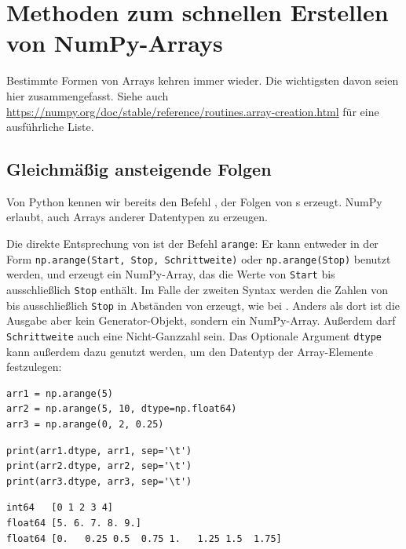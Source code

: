 \section{Methoden zum schnellen Erstellen von NumPy-Arrays}
Bestimmte Formen von Arrays kehren immer wieder. Die wichtigsten davon seien hier zusammengefasst. Siehe auch \url{https://numpy.org/doc/stable/reference/routines.array-creation.html} für eine ausführliche Liste.

\subsection{Gleichmäßig ansteigende Folgen}
Von Python kennen wir bereits den Befehl , der Folgen von s erzeugt. NumPy erlaubt, auch Arrays anderer Datentypen zu erzeugen.

Die direkte Entsprechung von  ist der Befehl \texttt{arange}: Er kann entweder in der Form \texttt{np.arange(Start, Stop, Schrittweite)} oder \texttt{np.arange(Stop)} benutzt werden, und erzeugt ein NumPy-Array, das die Werte von \texttt{Start} bis ausschließlich \texttt{Stop} enthält. Im Falle der zweiten Syntax werden die Zahlen von  bis ausschließlich \texttt{Stop} in Abständen von  erzeugt, wie bei . Anders als dort ist die Ausgabe aber kein Generator-Objekt, sondern ein NumPy-Array. Außerdem darf \texttt{Schrittweite} auch eine Nicht-Ganzzahl sein. Das Optionale Argument \texttt{dtype} kann außerdem dazu genutzt werden, um den Datentyp der Array-Elemente festzulegen:

\begin{codebox}
\begin{verbatim}
arr1 = np.arange(5)
arr2 = np.arange(5, 10, dtype=np.float64)
arr3 = np.arange(0, 2, 0.25)
\end{verbatim}
\end{codebox}
%
\begin{codebox}[]
\begin{verbatim}
print(arr1.dtype, arr1, sep='\t')
print(arr2.dtype, arr2, sep='\t')
print(arr3.dtype, arr3, sep='\t')
\end{verbatim}
\end{codebox}

\begin{cmdbox}
\begin{verbatim}
int64   [0 1 2 3 4]
float64 [5. 6. 7. 8. 9.]
float64 [0.   0.25 0.5  0.75 1.   1.25 1.5  1.75]
\end{verbatim}
\end{cmdbox}

